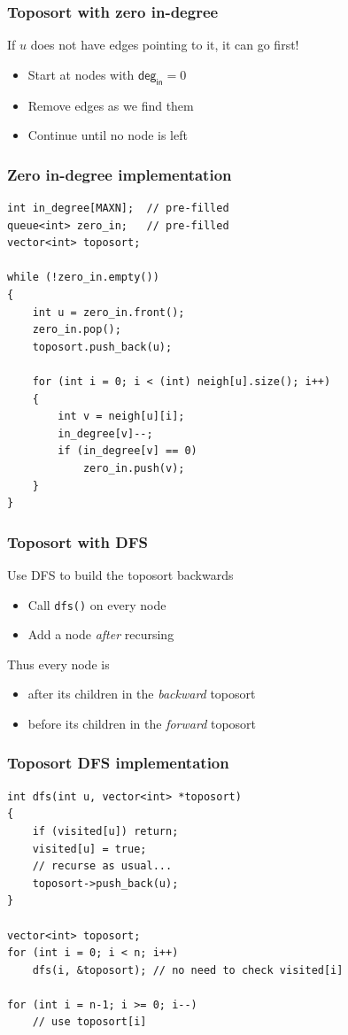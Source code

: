 \documentclass[12pt]{beamer}
\begin{document}
\begin{frame}
\frametitle{Toposort with zero in-degree}
If $u$ does not have edges pointing to it, it can go first!
\begin{itemize}
\item Start at nodes with $\mathsf{deg}_\mathsf{in} = 0$
\item Remove edges as we find them
\item Continue until no node is left
\end{itemize}
\end{frame}

\begin{frame}[fragile]
\frametitle{Zero in-degree implementation}
\begin{lstlisting}
int in_degree[MAXN];  // pre-filled
queue<int> zero_in;   // pre-filled
vector<int> toposort;

while (!zero_in.empty())
{
    int u = zero_in.front();
    zero_in.pop();
    toposort.push_back(u);
    
    for (int i = 0; i < (int) neigh[u].size(); i++)
    {
        int v = neigh[u][i];
        in_degree[v]--;
        if (in_degree[v] == 0)
            zero_in.push(v);
    }
}
\end{lstlisting}
\end{frame}

\begin{frame}
\frametitle{Toposort with DFS}
Use DFS to build the toposort backwards
\begin{itemize}
\item Call \texttt{dfs()} on every node
\item Add a node \emph{after} recursing
\end{itemize}
Thus every node is
\begin{itemize}
\item after its children in the \emph{backward} toposort
\item before its children in the \emph{forward} toposort
\end{itemize}
\end{frame}

\begin{frame}[fragile]
\frametitle{Toposort DFS implementation}
\begin{lstlisting}
int dfs(int u, vector<int> *toposort)
{
    if (visited[u]) return;
    visited[u] = true;
    // recurse as usual...
    toposort->push_back(u);
}

vector<int> toposort;
for (int i = 0; i < n; i++)
    dfs(i, &toposort); // no need to check visited[i]

for (int i = n-1; i >= 0; i--)
    // use toposort[i]
\end{lstlisting}
\end{frame}
\end{document}
